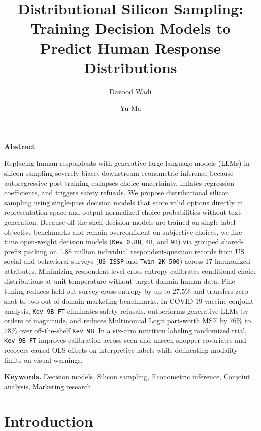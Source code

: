 \documentclass[
  letterpaper,
  DIV=11,
  numbers=noendperiod]{scrartcl}
\title{Distributional Silicon Sampling: Training Decision Models to
Predict Human Response Distributions}
\author{Davood Wadi \and Yu Ma}
\date{}
\begin{document}
\maketitle


\textbf{Abstract}

Replacing human respondents with generative large language models (LLMs)
in silicon sampling severely biases downstream econometric inference
because autoregressive post-training collapses choice uncertainty,
inflates regression coefficients, and triggers safety refusals. We
propose distributional silicon sampling using single-pass decision
models that score valid options directly in representation space and
output normalized choice probabilities without text generation. Because
off-the-shelf decision models are trained on single-label objective
benchmarks and remain overconfident on subjective choices, we fine-tune
open-weight decision models (\texttt{Kev\ 0.8B}, \texttt{4B}, and
\texttt{9B}) via grouped shared-prefix packing on 1.88 million
individual respondent-question records from US social and behavioral
surveys (\texttt{US\ ISSP} and \texttt{Twin-2K-500}) across 17
harmonized attributes. Minimizing respondent-level cross-entropy
calibrates conditional choice distributions at unit temperature without
target-domain human data. Fine-tuning reduces held-out survey
cross-entropy by up to \(27.5\%\) and transfers zero-shot to two
out-of-domain marketing benchmarks. In COVID-19 vaccine conjoint
analysis, \texttt{Kev\ 9B\ FT} eliminates safety refusals, outperforms
generative LLMs by orders of magnitude, and reduces Multinomial Logit
part-worth MSE by \(76\%\) to \(78\%\) over off-the-shelf
\texttt{Kev\ 9B}. In a six-arm nutrition labeling randomized trial,
\texttt{Kev\ 9B\ FT} improves calibration across seen and unseen shopper
covariates and recovers causal OLS effects on interpretive labels while
delineating modality limits on visual warnings.

\textbf{Keywords.} Decision models, Silicon sampling, Econometric
inference, Conjoint analysis, Marketing research

\section{Introduction}\label{sec-intro}
\end{document}
